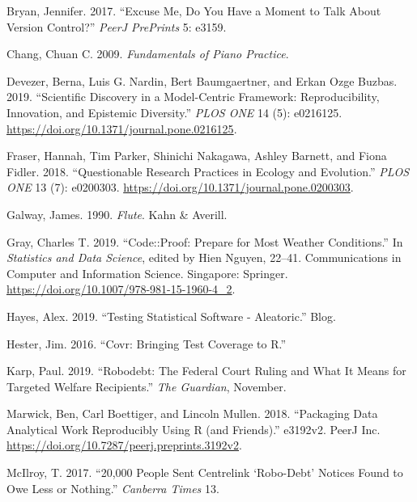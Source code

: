 \documentclass[
]{article}
\newlength{\cslhangindent}
\newenvironment{cslreferences}%
  {\setlength{\parindent}{0pt}%
  \everypar{\setlength{\hangindent}{\cslhangindent}}\ignorespaces}%
  {\par}
\begin{document}
\hypertarget{refs}{}
\begin{cslreferences}
\leavevmode\hypertarget{ref-Bryan2017ExcuseMD}{}%
Bryan, Jennifer. 2017. ``Excuse Me, Do You Have a Moment to Talk About
Version Control?'' \emph{PeerJ PrePrints} 5: e3159.

\leavevmode\hypertarget{ref-chang_fundamentalspianopractice_2009a}{}%
Chang, Chuan C. 2009. \emph{Fundamentals of Piano Practice}.

\leavevmode\hypertarget{ref-devezerScientificDiscoveryModelcentric2019}{}%
Devezer, Berna, Luis G. Nardin, Bert Baumgaertner, and Erkan Ozge
Buzbas. 2019. ``Scientific Discovery in a Model-Centric Framework:
Reproducibility, Innovation, and Epistemic Diversity.'' \emph{PLOS ONE}
14 (5): e0216125. \url{https://doi.org/10.1371/journal.pone.0216125}.

\leavevmode\hypertarget{ref-fraser_questionable_2018}{}%
Fraser, Hannah, Tim Parker, Shinichi Nakagawa, Ashley Barnett, and Fiona
Fidler. 2018. ``Questionable Research Practices in Ecology and
Evolution.'' \emph{PLOS ONE} 13 (7): e0200303.
\url{https://doi.org/10.1371/journal.pone.0200303}.

\leavevmode\hypertarget{ref-galway_flute_1990}{}%
Galway, James. 1990. \emph{Flute}. Kahn \& Averill.

\leavevmode\hypertarget{ref-grayCodeProofPrepare2019}{}%
Gray, Charles T. 2019. ``Code::Proof: Prepare for Most Weather
Conditions.'' In \emph{Statistics and Data Science}, edited by Hien
Nguyen, 22--41. Communications in Computer and Information Science.
Singapore: Springer. \url{https://doi.org/10.1007/978-981-15-1960-4_2}.

\leavevmode\hypertarget{ref-hayes_testing_2019}{}%
Hayes, Alex. 2019. ``Testing Statistical Software - Aleatoric.'' Blog.

\leavevmode\hypertarget{ref-hester_covr_2016}{}%
Hester, Jim. 2016. ``Covr: Bringing Test Coverage to R.''

\leavevmode\hypertarget{ref-karp_robodebtfederalcourt_2019}{}%
Karp, Paul. 2019. ``Robodebt: The Federal Court Ruling and What It Means
for Targeted Welfare Recipients.'' \emph{The Guardian}, November.

\leavevmode\hypertarget{ref-marwick_packaging_2018}{}%
Marwick, Ben, Carl Boettiger, and Lincoln Mullen. 2018. ``Packaging Data
Analytical Work Reproducibly Using R (and Friends).'' e3192v2. PeerJ
Inc. \url{https://doi.org/10.7287/peerj.preprints.3192v2}.

\leavevmode\hypertarget{ref-mcilroy201720}{}%
McIlroy, T. 2017. ``20,000 People Sent Centrelink `Robo-Debt' Notices
Found to Owe Less or Nothing.'' \emph{Canberra Times} 13.


\end{cslreferences}
\end{document}
